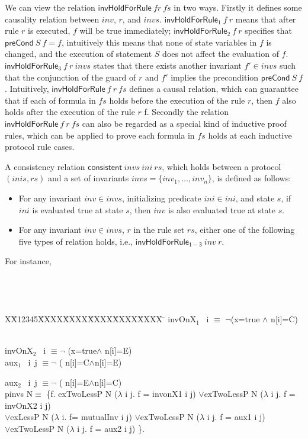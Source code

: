 \documentclass{llncs}
\newlength{\fminilength}
\newenvironment{fmini}[1][\linewidth]
  {\setlength{\fminilength}{#1\fboxsep-2\fboxrule}%
   \vspace{2ex}\noindent\begin{lrbox}{\fminibox}\begin{minipage}{\fminilength}%
   \mbox{ }\hfill\vspace{-2.5ex}}%
  {\end{minipage}\end{lrbox}\vspace{1ex}\hspace{0ex}%
   \framebox{\usebox{\fminibox}}}
\newenvironment{specification}
{\noindent\footnotesize
\tt\begin{fmini}\begin{tabbing}X\=X12345\=XXXX\=XXXX\=XXXX\=XXXX\=XXXX
\=\+\kill} {\end{tabbing}\normalfont\end{fmini}}
\begin{document}
 We can view the relation $\mathsf{invHoldForRule}~ f
r ~fs$ in two ways. Firstly it defines some causality relation
between $inv$, $r$, and $invs$.  $\mathsf{invHoldForRule}_1~f~ r$
  means that after rule $r$ is executed,
 $f$ will be true immediately;   $\mathsf{invHoldForRule}_2~f~ r$ specifies that
 $\mathsf{preCond}~S~f=f$, intuitively this means that none of state variables in $f$ is
 changed, and the execution of statement $S$ does not affect the
 evaluation of $f$.
 $\mathsf{invHoldForRule}_3~f~ r~invs$ states
  that  there exists another invariant $f' \in invs$ such that
  the conjunction of the guard of $r$ and $f'$ implies the precondition  $\mathsf{preCond}~S~f$.
Intuitively, $\mathsf{invHoldForRule} ~f ~r ~fs$ defines a causal
relation, which can guaranttee that if each of formula in $fs$ holds
before the execution of the rule $r$, then  $f$ also holds after the
execution of the rule $r$ f. Secondly the relation
$\mathsf{invHoldForRule} ~f ~r ~fs$ can also be regarded as a
special kind of inductive proof rules, which can be applied to prove
each formula in $fs$ holds at each inductive protocol rule cases.


\begin{definition}
A consistency relation $\mathsf{consistent}~ invs ~ini~ rs$,
 which holds between a protocol $(inis,rs)$ and
a set of invariants $invs=\{inv_1,\ldots, inv_n\}$,  is defined as
follows:
%
\begin{itemize}
\item For any invariant $inv \in invs$,
initializing predicate $ini \in ini$, and state $s$, if $ini$ is
evaluated true at state $s$, then $inv$ is also evaluated true at
state $s$.

\item For any invariant $inv \in invs$, $r$ in the rule set
$rs$, either one of the following five types of relation holds,
i.e., $\mathsf{invHoldForRule_{1-3}}~inv~ r$.

\end{itemize}
\end{definition}


For instance,

\begin{specification}
invOnX$_1$ ~i $\equiv$ $\neg$(x=true $\wedge$ n[i]=C)   \ \ \

invOnX$_2$ ~i $\equiv \neg$ (x=true$\wedge$ n[i]=E)  \\


aux$_1$ ~i~j $\equiv \neg$ ( n[i]=C$\wedge$n[i]=E)   \ \ \

aux$_2$ ~i~j $\equiv \neg$  ( n[i]=E$\wedge$n[i]=C)\\

  pinvs N$\equiv$ \{f. exTwoLessP N ($\lambda$ i j.  f = invonX1 i j) $\vee$exTwoLessP N ($\lambda$ i j.  f = invOnX2 i j)   \\
$\vee$exLessP N ($\lambda$ i.  f= mutualInv i j)    $\vee$exTwoLessP N ($\lambda$ i j.  f =  aux1 i j) \\
$\vee$exTwoLessP N ($\lambda$ i j.  f =  aux2 i j) \}.

\end{specification}
\end{document}
